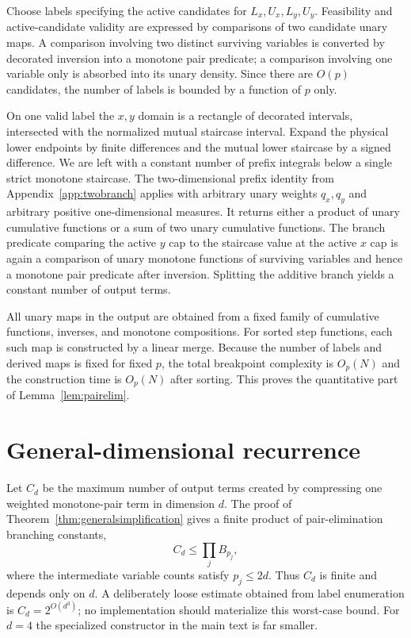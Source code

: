 \documentclass[12pt,a4paper]{article}
\theoremstyle{definition}
\newcommand{\1}{\mathbf 1}
\begin{document}
Choose labels specifying the active candidates for $L_x,U_x,L_y,U_y$.  Feasibility and active-candidate validity are expressed by comparisons of two candidate unary maps.  A comparison involving two distinct surviving variables is converted by decorated inversion into a monotone pair predicate; a comparison involving one variable only is absorbed into its unary density.  Since there are $O(p)$ candidates, the number of labels is bounded by a function of $p$ only.

On one valid label the $x,y$ domain is a rectangle of decorated intervals, intersected with the normalized mutual staircase interval.  Expand the physical lower endpoints by finite differences and the mutual lower staircase by a signed difference.  We are left with a constant number of prefix integrals below a single strict monotone staircase.  The two-dimensional prefix identity from Appendix~\ref{app:twobranch} applies with arbitrary unary weights $q_x,q_y$ and arbitrary positive one-dimensional measures.  It returns either a product of unary cumulative functions or a sum of two unary cumulative functions.  The branch predicate comparing the active $y$ cap to the staircase value at the active $x$ cap is again a comparison of unary monotone functions of surviving variables and hence a monotone pair predicate after inversion.  Splitting the additive branch yields a constant number of output terms.

All unary maps in the output are obtained from a fixed family of cumulative functions, inverses, and monotone compositions.  For sorted step functions, each such map is constructed by a linear merge.  Because the number of labels and derived maps is fixed for fixed $p$, the total breakpoint complexity is $O_p(N)$ and the construction time is $O_p(N)$ after sorting.  This proves the quantitative part of Lemma~\ref{lem:pairelim}.

\section{General-dimensional recurrence}                         \label{app:generaldrecurrence}

Let $C_d$ be the maximum number of output terms created by compressing one weighted monotone-pair term in dimension $d$.  The proof of Theorem~\ref{thm:generalsimplification} gives a finite product of pair-elimination branching constants,
\[
C_d\le \prod_j B_{p_j},
\]
where the intermediate variable counts satisfy $p_j\le2d$.  Thus $C_d$ is finite and depends only on $d$.  A deliberately loose estimate obtained from label enumeration is $C_d=2^{O(d^3)}$; no implementation should materialize this worst-case bound.  For $d=4$ the specialized constructor in the main text is far smaller.
\end{document}
